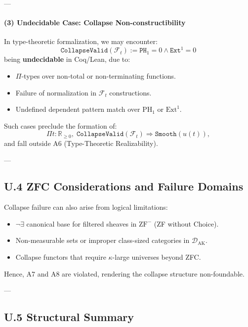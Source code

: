 \documentclass[11pt]{article}
\begin{document}
---

\paragraph{(3) Undecidable Case: Collapse Non-constructibility}

In type-theoretic formalization, we may encounter:
\[
\texttt{CollapseValid}(\mathcal{F}_t) := \texttt{PH}_1 = 0 \wedge \texttt{Ext}^1 = 0
\]
being \textbf{undecidable} in Coq/Lean, due to:

\begin{itemize}
  \item $\Pi$-types over non-total or non-terminating functions.
  \item Failure of normalization in $\mathcal{F}_t$ constructions.
  \item Undefined dependent pattern match over $\mathrm{PH}_1$ or $\mathrm{Ext}^1$.
\end{itemize}

Such cases preclude the formation of:
\[
\Pi t : \mathbb{R}_{\ge 0},\; \texttt{CollapseValid}(\mathcal{F}_t) \Rightarrow \texttt{Smooth}(u(t)),
\]
and fall outside A6 (Type-Theoretic Realizability).

---

\subsection*{U.4 ZFC Considerations and Failure Domains}

Collapse failure can also arise from logical limitations:

\begin{itemize}
  \item $\neg \exists$ canonical base for filtered sheaves in $\mathrm{ZF}^-$ (ZF without Choice).
  \item Non-measurable sets or improper class-sized categories in $\mathcal{D}_{\mathrm{AK}}$.
  \item Collapse functors that require $\kappa$-large universes beyond ZFC.
\end{itemize}

Hence, A7 and A8 are violated, rendering the collapse structure non-foundable.

---

\subsection*{U.5 Structural Summary}
\end{document}
